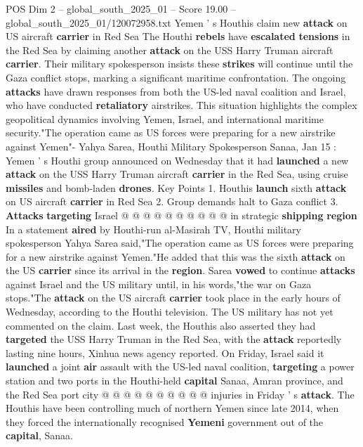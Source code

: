 \begin{textsample}{POS Dim 2 – global\_south\_2025\_01 – Score 19.00 – global\_south\_2025\_01/120072958.txt}  \label{ex:f2_pos_327}
Yemen ' s Houthis claim new \textbf{attack} on US aircraft \textbf{carrier} in Red Sea The Houthi \textbf{rebels} have \textbf{escalated} \textbf{tensions} in the Red Sea by claiming another \textbf{attack} on the USS Harry Truman aircraft \textbf{carrier}.
Their military spokesperson insists these \textbf{strikes} will continue until the Gaza conflict stops, marking a significant maritime confrontation.
The ongoing \textbf{attacks} have drawn responses from both the US-led naval coalition and Israel, who have conducted \textbf{retaliatory} airstrikes.
This situation highlights the complex geopolitical dynamics involving Yemen, Israel, and international maritime security."The operation came as US forces were preparing for a new airstrike against Yemen"- Yahya Sarea, Houthi Military Spokesperson Sanaa, Jan 15 : Yemen ' s Houthi group announced on Wednesday that it had \textbf{launched} a new \textbf{attack} on the USS Harry Truman aircraft \textbf{carrier} in the Red Sea, using cruise \textbf{missiles} and bomb-laden \textbf{drones}.
Key Points 1.
Houthis \textbf{launch} sixth \textbf{attack} on US aircraft \textbf{carrier} in Red Sea 2.
Group demands halt to Gaza conflict 3. \textbf{Attacks} \textbf{targeting} Israel @ @ @ @ @ @ @ @ @ @ in strategic \textbf{shipping} \textbf{region} In a statement \textbf{aired} by Houthi-run al-Masirah TV, Houthi military spokesperson Yahya Sarea said,"The operation came as US forces were preparing for a new airstrike against Yemen."He added that this was the sixth \textbf{attack} on the US \textbf{carrier} since its arrival in the \textbf{region}.
Sarea \textbf{vowed} to continue \textbf{attacks} against Israel and the US military until, in his words,"the war on Gaza stops."The \textbf{attack} on the US aircraft \textbf{carrier} took place in the early hours of Wednesday, according to the Houthi television.
The US military has not yet commented on the claim.
Last week, the Houthis also asserted they had \textbf{targeted} the USS Harry Truman in the Red Sea, with the \textbf{attack} reportedly lasting nine hours, Xinhua news agency reported.
On Friday, Israel said it \textbf{launched} a joint \textbf{air} assault with the US-led naval coalition, \textbf{targeting} a power station and two ports in the Houthi-held \textbf{capital} Sanaa, Amran province, and the Red Sea port city @ @ @ @ @ @ @ @ @ @ injuries in Friday ' s \textbf{attack}.
The Houthis have been controlling much of northern Yemen since late 2014, when they forced the internationally recognised \textbf{Yemeni} government out of the \textbf{capital}, Sanaa.

\end{textsample}
